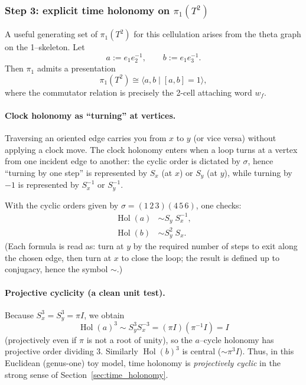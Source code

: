 \documentclass[11pt,oneside]{amsbook}
\numberwithin{equation}{section}
\theoremstyle{plain}
\theoremstyle{definition}
\theoremstyle{remark}
\DeclareMathOperator{\Hol}{\mathrm{Hol}}
\begin{document}
\subsubsection{Step 3: explicit time holonomy on $\pi_1(T^2)$}

A useful generating set of $\pi_1(T^2)$ for this cellulation arises from the theta graph on the 1--skeleton.
Let
\[
a := e_1 e_2^{-1},\qquad b:=e_1 e_3^{-1}.
\]
Then $\pi_1$ admits a presentation
\[
\pi_1(T^2)\cong \langle a,b\mid [a,b]=1\rangle,
\]
where the commutator relation is precisely the 2-cell attaching word $w_f$.

\paragraph{Clock holonomy as ``turning'' at vertices.}
Traversing an oriented edge carries you from $x$ to $y$ (or vice versa) without applying a clock move.
The clock holonomy enters when a loop turns at a vertex from one incident edge to another: the cyclic order is dictated by $\sigma$, hence ``turning by one step'' is represented by $S_x$ (at $x$) or $S_y$ (at $y$), while turning by $-1$ is represented by $S_x^{-1}$ or $S_y^{-1}$.

With the cyclic orders given by $\sigma=(1\,2\,3)(4\,5\,6)$, one checks:
\begin{align}
\Hol(a) &\sim S_y\;S_x^{-1},\label{eq:torus_holonomy_a}\\
\Hol(b) &\sim S_y^{2}\;S_x.\label{eq:torus_holonomy_b}
\end{align}
(Each formula is read as: turn at $y$ by the required number of steps to exit along the chosen edge, then turn at $x$ to close the loop; the result is defined up to conjugacy, hence the symbol $\sim$.)

\paragraph{Projective cyclicity (a clean unit test).}
Because $S_x^3=S_y^3=\pi I$, we obtain
\[
\Hol(a)^3 \sim S_y^3 S_x^{-3} = (\pi I)(\pi^{-1}I)=I
\]
(projectively even if $\pi$ is not a root of unity),
so the $a$--cycle holonomy has projective order dividing $3$.
Similarly $\Hol(b)^3$ is central ($\sim \pi^3 I$).
Thus, in this Euclidean (genus-one) toy model, time holonomy is \emph{projectively cyclic} in the strong sense of Section~\ref{sec:time_holonomy}.
\end{document}
